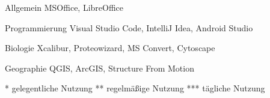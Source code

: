 

\begin{cvpairs}

  
\cvpair
    {Allgemein} %
    {MSOffice, LibreOffice} %

  
\cvpair
    {Programmierung} %
    {Visual Studio Code, IntelliJ Idea, Android Studio} %

  
\cvpair
    {Biologie} %
    {Xcalibur, Proteowizard, MS Convert, Cytoscape} %

  
\cvpair
    {Geographie} %
    {QGIS, ArcGIS, Structure From Motion} %

\end{cvpairs}

{\color{teal}\footnotesize
* gelegentliche Nutzung \quad
** regelmäßige Nutzung \quad
*** tägliche Nutzung
}